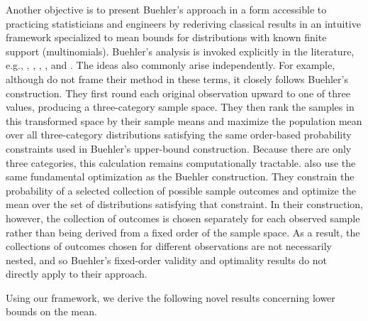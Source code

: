 \documentclass{article}
\theoremstyle{definition}
\theoremstyle{remark}
\begin{document}
Another objective is to present Buehler’s approach in a form accessible to practicing statisticians and engineers by rederiving classical results in an intuitive framework specialized to mean bounds for distributions with known finite support (multinomials).
Buehler's analysis is invoked explicitly in the literature, e.g., \cite{reiser1991comment}, \cite{jobe1992buehler}, \cite{willits1997series}, \cite{lloyd2007exact}, and \cite{bancal2022simple}. The ideas also commonly arise independently. %
For example, although \cite{StarkTrinomial} do not frame their method in these terms, it closely follows Buehler's construction. They first round each original observation upward to one of three values, producing a three-category sample space. They then rank the samples in this transformed space by their sample means and maximize the population mean over all three-category distributions satisfying the same order-based probability constraints used in Buehler's upper-bound construction. Because there are only three categories, this calculation remains computationally tractable. \cite{Fienberg77} also use the same fundamental optimization as the Buehler construction. They constrain the probability of a selected collection of possible sample outcomes and optimize the mean over the set of distributions satisfying that constraint. In their construction, however, the collection of outcomes is chosen separately for each observed sample rather than being derived from a fixed order of the sample space. As a result, the collections of outcomes chosen for different observations are not necessarily nested, and so Buehler's fixed-order validity and optimality results do not directly apply to their approach.
\color{black}


Using our framework, we derive the following novel results concerning lower bounds on the mean.
\end{document}
